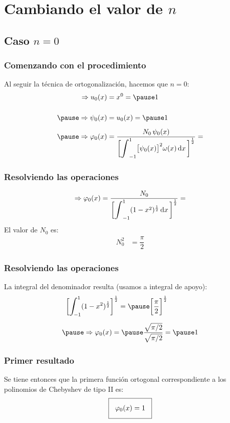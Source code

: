 \documentclass[12pt]{beamer}
\begin{document}
\section{Cambiando el valor de \texorpdfstring{$n$}{n}}
\subsection{Caso \texorpdfstring{$n=0$}{n=0}}

\begin{frame}
\frametitle{Comenzando con el procedimiento}
Al seguir la técnica de ortogonalización, \pause hacemos que $n = 0$:
\pause
\begin{eqnarray*}
\begin{aligned}
\Rightarrow u_{0} (x) &=  x^{0} = \pause 1 \\[0.5cm] \pause
\Rightarrow \psi_{0} (x) &= u_{0} (x) = \pause  1 \\[0.5em] \pause
\Rightarrow \varphi_{0} (x) &= \dfrac{N_{0} \, \psi_{0} (x)}{\bigg[ \scaleint{6ex}_{-1}^{1} \big[ \psi_{0} (x) \big]^{2} \omega (x) \dd{x} \bigg]^{\frac{1}{2}}} = 
\end{aligned}
\end{eqnarray*}
\end{frame}
\begin{frame}
\frametitle{Resolviendo las operaciones}
\begin{align*}
\Rightarrow \varphi_{0} (x) = \dfrac{N_{0}}{\bigg[ \scaleint{6ex}_{-1}^{1} (1 -x^{2})^{\frac{1}{2}} \dd{x} \bigg]^{\frac{1}{2}}} =
\end{align*}
El valor de $N_{0}$ es:
\pause
\begin{align*}
N_{0}^{2} &= \dfrac{\pi}{2}
\end{align*}
\end{frame}
\begin{frame}
\frametitle{Resolviendo las operaciones}
La integral del denominador resulta (usamos a integral de apoyo):
\pause
\begin{eqnarray*}
\begin{aligned}
\bigg[ \scaleint{6ex}_{\bs -1}^{1} (&1 - x^{2})^{\frac{1}{2}} \bigg]^{\frac{1}{2}} = \pause \bigg[ \dfrac{\pi}{2} \bigg]^{\frac{1}{2}} \\[0.5em] \pause
&\Rightarrow \varphi_{0}(x) = \pause \dfrac{\sqrt{\pi/2}}{\sqrt{\pi/2}} = \pause 1
\end{aligned}
\end{eqnarray*}
\end{frame}
\begin{frame}
\frametitle{Primer resultado}
Se tiene entonces que la primera función ortogonal correspondiente a los polinomios de Chebyshev de tipo II es:
\pause
\begin{align*}
\setlength{\fboxsep}{3\fboxsep}\boxed{
\varphi_{0} (x) = 1}
\end{align*}
\end{frame}
\end{document}
